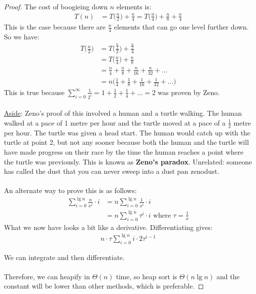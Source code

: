 \documentclass[]{article}
\theoremstyle{definition}
\begin{document}
\begin{proof}
				The cost of boogieing down $n$ elements is:
				\begin{align*}
					T(n) &= T\bigg(\frac{n}{2}\bigg) + \frac{n}{4} = T\bigg(\frac{n}{4}\bigg) + \frac{n}{8} + \frac{n}{4}
				\end{align*}
				This is the case because there are $\frac{n}{4}$ elements that can go one level further down. So we have:
				\begin{align*}
					T\bigg(\frac{n}{2}\bigg) &= T\bigg(\frac{\frac{n}{2}}{2}\bigg) + \frac{\frac{n}{2}}{4} \\
					&= T\bigg(\frac{n}{4}\bigg) + \frac{n}{8} \\
					&= \frac{n}{4} + \frac{n}{8} + \frac{n}{16} + \frac{n}{32} + \ldots \\
					&= n\bigg(\frac{1}{4} + \frac{1}{8} + \frac{1}{16} + \frac{1}{32} + \ldots\bigg)
				\end{align*}
				This is true because $\sum_{i = 0}^{\infty} \frac{1}{2^i} = 1 + \frac{1}{2} + \frac{1}{4} + \ldots = 2$ was proven by Zeno.
				\\ \\
				\underline{Aside}: Zeno's proof of this involved a human and a turtle walking. The human walked at a pace of 1 metre per hour and the turtle moved at a pace of a $\frac{1}{2}$ metre per hour. The turtle was given a head start. The human would catch up with the turtle at point 2, but not any sooner because both the human and the turtle will have made progress on their race by the time the human reaches a point where the turtle was previously. This is known as \textbf{Zeno's paradox}. Unrelated: someone has called the dust that you can never sweep into a dust pan zenodust.
				\\ \\
				An alternate way to prove this is as follows:
				\begin{align*}
					\sum_{i = 0}^{\lg n} \frac{n}{x^i} \cdot i &= n \sum_{i = 0}^{\lg n} \frac{1}{x^i} \cdot i \\
					&= n \sum_{i = 0}^{\lg n} \tau^i \cdot i \text{ where } \tau = \frac{1}{x}
				\end{align*}
				What we now have looks a bit like a derivative. Differentiating gives:
				\begin{align*}
					n \cdot \tau \sum_{i = 0}^{\lg n} i \cdot 2 \tau^{i - 1}
				\end{align*}

				We can integrate and then differentiate.
				\\ \\
				Therefore, we can heapify in $\Theta(n)$ time, so heap sort is $\Theta(n \lg n)$ and the constant will be lower than other methods, which is preferable.
			\end{proof}
\end{document}

